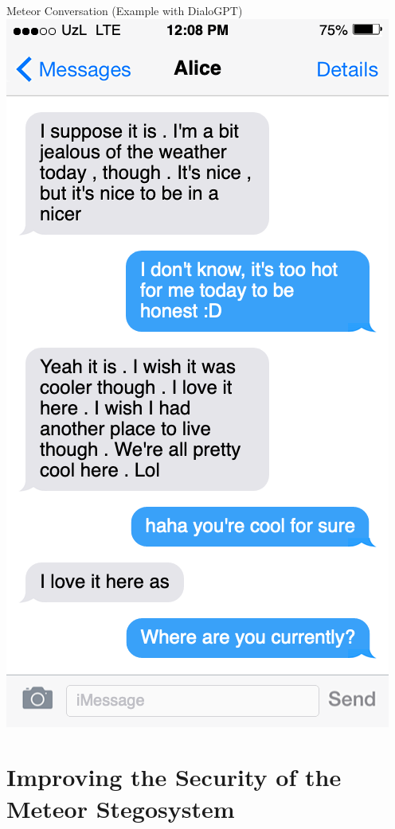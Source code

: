 \documentclass[10pt]{beamer}
\begin{document}
\begin{frame}{Meteor Conversation (Example with DialoGPT)}
	\centering
	\includegraphics[height=0.9\textheight]{twoway_dialogpt.png}
\end{frame}

\section{Improving the Security of the Meteor Stegosystem}
\end{document}
